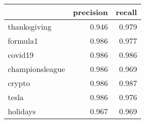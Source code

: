 \begin{tabular}{lrr}
\toprule
{} &  precision &  recall \\
\midrule
thanksgiving    &      0.946 &   0.979 \\
formula1        &      0.986 &   0.977 \\
covid19         &      0.986 &   0.986 \\
championsleague &      0.986 &   0.969 \\
crypto          &      0.986 &   0.987 \\
tesla           &      0.986 &   0.976 \\
holidays        &      0.967 &   0.969 \\
\bottomrule
\end{tabular}